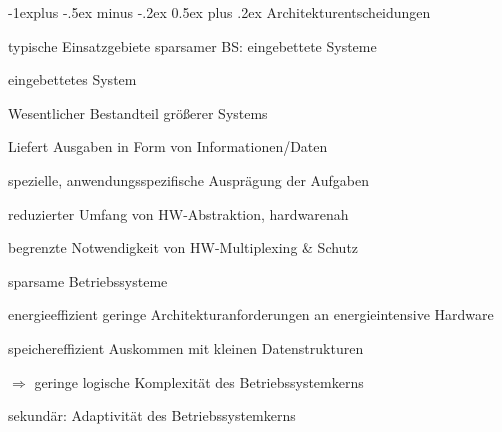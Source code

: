\documentclass[a4paper]{article}
\makeatletter
\renewcommand{\subsection}{\@startsection{subsection}{2}{0mm}%
 {-1explus -.5ex minus -.2ex}%
 {0.5ex plus .2ex}%
 {\normalfont\normalsize\bfseries}}
\makeatother
\begin{document}
\begin{multicols}{3}
    \subsection{Architekturentscheidungen}
    \begin{itemize*}
        \item typische Einsatzgebiete sparsamer BS: eingebettete Systeme
        \item eingebettetes System
        \begin{itemize*}
            \item Wesentlicher Bestandteil größerer Systems
            \item Liefert Ausgaben in Form von Informationen/Daten
        \end{itemize*}
        \item spezielle, anwendungsspezifische Ausprägung der Aufgaben
        \begin{itemize*}
            \item reduzierter Umfang von HW-Abstraktion, hardwarenah %
            \item begrenzte Notwendigkeit von HW-Multiplexing \& Schutz
        \end{itemize*}
        \item sparsame Betriebssysteme
        \begin{description*}
            \item[energieeffizient] geringe Architekturanforderungen an energieintensive Hardware
            \item[speichereffizient] Auskommen mit kleinen Datenstrukturen
        \end{description*}
        \item[$\Rightarrow$] geringe logische Komplexität des Betriebssystemkerns
        \item sekundär: Adaptivität des Betriebssystemkerns
    \end{itemize*}


\end{multicols}
\end{document}
